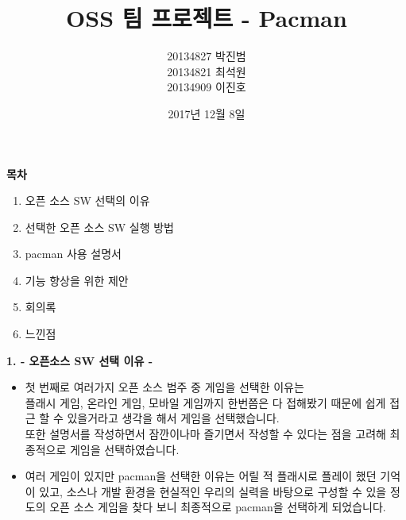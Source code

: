 \documentclass{article}
\begin{document}
 
\title{\textbf{OSS 팀 프로젝트 - Pacman}}
\author {20134827 박진범\\20134821 최석원\\20134909 이진호}
\date{2017년 12월 8일}
\maketitle
 
 
 
\newpage
\begin{huge}\begin{center}\textbf{목차\\}\end{center}\end{huge}
 
\begin{enumerate}
 
\item 오픈 소스 SW 선택의 이유
\item 선택한 오픈 소스 SW 실행 방법
\item pacman 사용 설명서
\item 기능 향상을 위한 제안
\item 회의록 
\item 느낀점
 
\end{enumerate}

\newpage

\flushleft
\begin{large}\textbf{1. - 오픈소스 SW 선택 이유 -}\end{large}
\begin{itemize}
 
\item 첫 번째로 여러가지 오픈 소스 범주 중 게임을 선택한 이유는\\ 
플래시 게임, 온라인 게임, 모바일 게임까지 한번쯤은 다 접해봤기 때문에 쉽게 접근 할 수 있을거라고 생각을 해서 게임을 선택했습니다. \\
또한 설명서를 작성하면서 잠깐이나마 즐기면서 작성할 수 있다는 점을 고려해 최종적으로 게임을 선택하였습니다.\\


\item 여러 게임이 있지만 pacman을 선택한 이유는 어릴 적 플래시로 플레이 했던 기억이 있고, 소스나 개발 환경을 현실적인 우리의 실력을 바탕으로 구성할 수 있을 정도의 오픈 소스 게임을 찾다 보니 최종적으로 pacman을 선택하게 되었습니다.\\
 
\end{itemize}
\end{document}
